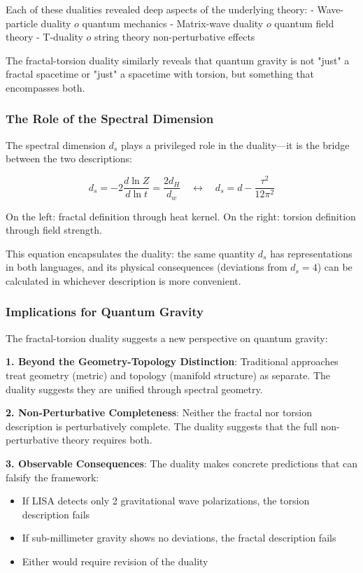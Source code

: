 Each of these dualities revealed deep aspects of the underlying theory:
- Wave-particle duality $	o$ quantum mechanics
- Matrix-wave duality $	o$ quantum field theory
- T-duality $	o$ string theory non-perturbative effects

The fractal-torsion duality similarly reveals that quantum gravity is not "just" a fractal spacetime or "just" a spacetime with torsion, but something that encompasses both.

\subsubsection{The Role of the Spectral Dimension}

The spectral dimension $d_s$ plays a privileged role in the duality—it is the bridge between the two descriptions:

\begin{equation}
    \boxed{d_s = -2 \frac{d\ln Z}{d\ln t} = \frac{2d_H}{d_w} \quad \leftrightarrow \quad d_s = d - \frac{\tau^2}{12\pi^2}}
\end{equation}

On the left: fractal definition through heat kernel.  
On the right: torsion definition through field strength.

This equation encapsulates the duality: the same quantity $d_s$ has representations in both languages, and its physical consequences (deviations from $d_s = 4$) can be calculated in whichever description is more convenient.

\subsubsection{Implications for Quantum Gravity}

The fractal-torsion duality suggests a new perspective on quantum gravity:

\textbf{1. Beyond the Geometry-Topology Distinction}: Traditional approaches treat geometry (metric) and topology (manifold structure) as separate. The duality suggests they are unified through spectral geometry.

\textbf{2. Non-Perturbative Completeness}: Neither the fractal nor torsion description is perturbatively complete. The duality suggests that the full non-perturbative theory requires both.

\textbf{3. Observable Consequences}: The duality makes concrete predictions that can falsify the framework:
\begin{itemize}
    \item If LISA detects only 2 gravitational wave polarizations, the torsion description fails
    \item If sub-millimeter gravity shows no deviations, the fractal description fails
    \item Either would require revision of the duality
\end{itemize}

